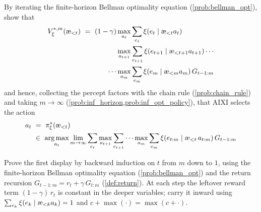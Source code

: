 \documentclass[fontsize=11pt, parskip=half]{scrartcl}
\DeclareMathOperator*{\argmax}{arg\,max}
\newcommand{\aes}{\textnormal{\ae}}
\begin{document}
\begin{exercise}
\label{prob:expectimax_derivation}
By iterating the finite-horizon Bellman optimality equation (\cref{prob:bellman_opt}), show that
\begin{align*}
    V_\xi^{*,m}(\aes_{<t})
    ~=~ (1-\gamma) &\max_{a_t} \sum_{e_t} \xi(e_t \mid \aes_{<t} a_t) \\
    &\max_{a_{t+1}} \sum_{e_{t+1}} \xi(e_{t+1} \mid \aes_{<t+1} a_{t+1}) \cdots \\
    \cdots &\max_{a_m} \sum_{e_m} \xi(e_m \mid \aes_{<m} a_m) \,G_{t-1:m}
\end{align*}
and hence, collecting the percept factors with the chain rule (\cref{prob:chain_rule}) and taking $m \to \infty$ (\cref{prob:inf_horizon,prob:inf_opt_policy}), that AIXI selects the action
\begin{align*}
    a_t &~=~ \pi_\xi^*(\aes_{<t}) \\
    &~\in~ \argmax_{a_t} \lim_{m\to\infty} \sum_{e_t} \max_{a_{t+1}} \sum_{e_{t+1}} \cdots \max_{a_m} \sum_{e_m}
    \xi(e_{t:m} \mid \aes_{<t}\, a_{t:m}) \,G_{t-1:m}
\end{align*}


\begin{hint}
Prove the first display by backward induction on $t$ from $m$ down to $1$, using the finite-horizon Bellman optimality equation (\cref{prob:bellman_opt}) and the return recursion $G_{t-1:m} = r_t + \gamma\, G_{t:m}$ (\cref{def:return}). At each step the leftover reward term $(1-\gamma)\, r_t$ is constant in the deeper variables; carry it inward using $\sum_{e_k} \xi(e_k \mid \aes_{<k} a_k) = 1$ and $c + \max(\cdot) = \max(c + \cdot)$.
\end{hint}
\end{exercise}
\end{document}
